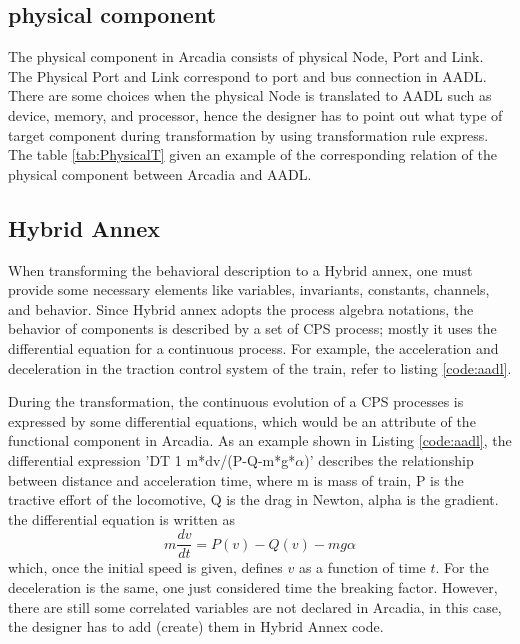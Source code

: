 \subsection{physical component}
The physical component in Arcadia consists of physical Node, Port and Link. The Physical Port and Link correspond to port and bus connection in AADL. There are some choices when the physical Node is translated to AADL such as device, memory, and processor, hence the designer has to point out what type of target component during transformation by using transformation rule express. The table \ref{tab:PhysicalT} given an example of the corresponding relation of the physical component between Arcadia and AADL.
\begin{table}[h]
\vskip 0.5cm
\caption{Physical elements corresponding table}
\label{tab:PhysicalT}
\end{table}


\subsection{Hybrid Annex}
When transforming the behavioral description to a Hybrid annex, one must provide some necessary elements like variables, invariants, constants, channels, and behavior. Since Hybrid annex adopts the process algebra notations, the behavior of components is described by a set of CPS process; mostly it uses the differential equation for a continuous process. For example, the acceleration and deceleration in the traction control system of the train, refer to listing \ref{code:aadl}. 

During the transformation, the continuous evolution of a CPS processes is expressed by some differential equations, which would be an attribute of the functional component in Arcadia. As an example shown in Listing \ref{code:aadl}, the differential expression 'DT 1 m*dv/(P-Q-m*g*$\alpha$)' describes the relationship between distance and acceleration time, where m is mass of train, P is the tractive effort of the locomotive, Q is the drag in Newton, alpha is the gradient. the differential equation is written as \[m\frac{dv}{dt}=P(v)-Q(v)-mg\alpha\] 
which, once the initial speed is given, defines $v$ as a function of time $t$. For the deceleration is the same, one just considered time the breaking factor. 
However, there are still some correlated variables are not declared in Arcadia, in this case, the designer has to add (create) them in Hybrid Annex code. 

